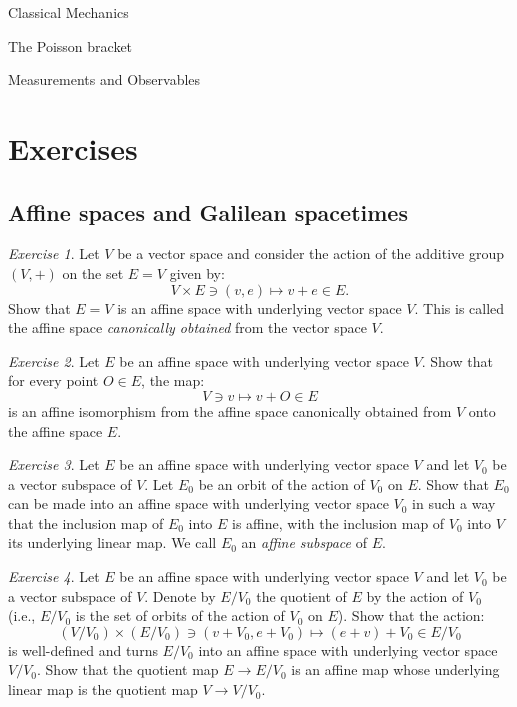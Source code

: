 \documentclass[oneside,a4paper,11pt]{amsbook}
\theoremstyle{remark}\newtheorem{exercise}{Exercise}[chapter]
\theoremstyle{plain}\newtheorem{teo}{Theorem}[section]
\theoremstyle{plain}\newtheorem{lem}[teo]{Lemma}
\theoremstyle{plain}\newtheorem{prop}[teo]{Proposition}
\theoremstyle{plain}\newtheorem{cor}[teo]{Corollary}
\theoremstyle{definition}\newtheorem{defin}[teo]{Definition}
\theoremstyle{remark}\newtheorem{rem}[teo]{Remark}
\theoremstyle{definition}\newtheorem{notation}[teo]{Notation}
\theoremstyle{definition}\newtheorem{convention}[teo]{Convention}
\theoremstyle{definition}\newtheorem{example}[teo]{Example}
\numberwithin{section}{chapter}
\numberwithin{equation}{section}
\begin{document}
\begin{chapter}{Classical Mechanics}
\begin{section}{The Poisson bracket}
\end{section}

\begin{section}{Measurements and Observables}



\end{section}

\section*{Exercises}

\subsection*{Affine spaces and Galilean spacetimes}

\begin{exercise}\label{exe:canaffine}
Let $V$ be a vector space and consider the action of the additive group $(V,+)$ on the set $E=V$ given by:
\[V\times E\ni(v,e)\longmapsto v+e\in E.\]
Show that $E=V$ is an affine space with underlying vector space $V$.
This is called the affine space {\em canonically obtained\/} from the vector space $V$.
\end{exercise}

\begin{exercise}\label{exe:vvplusO}
Let $E$ be an affine space with underlying vector space $V$. Show that for every point $O\in E$, the map:
\[V\ni v\longmapsto v+O\in E\]
is an affine isomorphism from the affine space canonically obtained from $V$ onto the affine space $E$.
\end{exercise}

\begin{exercise}\label{exe:affinesubspace}
Let $E$ be an affine space with underlying vector space $V$ and let $V_0$ be a vector subspace of $V$. Let $E_0$
be an orbit of the action of $V_0$ on $E$. Show that $E_0$ can be made into an affine space with underlying vector
space $V_0$ in such a way that the inclusion map of $E_0$ into $E$ is affine, with the inclusion map of $V_0$ into $V$
its underlying linear map. We call $E_0$ an {\em affine subspace\/} of $E$.
\end{exercise}

\begin{exercise}\label{eq:quotientaffine}
Let $E$ be an affine space with underlying vector space $V$ and let $V_0$ be a vector subspace of $V$. Denote
by $E/V_0$ the quotient of $E$ by the action of $V_0$ (i.e., $E/V_0$ is the set of orbits of the action of $V_0$ on $E$).
Show that the action:
\[(V/V_0)\times(E/V_0)\ni(v+V_0,e+V_0)\longmapsto(e+v)+V_0\in E/V_0\]
is well-defined and turns $E/V_0$ into an affine space with underlying vector space $V/V_0$. Show that the
quotient map $E\to E/V_0$ is an affine map whose underlying linear map is the quotient map $V\to V/V_0$.
\end{exercise}


\end{chapter}
\end{document}
